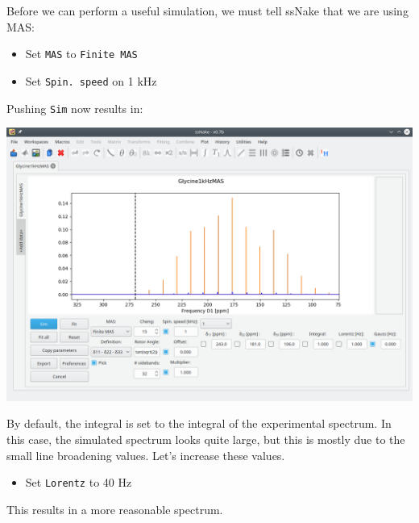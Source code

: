 \documentclass[11pt,a4paper]{article}
\begin{document}
Before we can perform a useful simulation, we must tell ssNake that we are using MAS:
\begin{itemize}
  \item Set \texttt{MAS} to \texttt{Finite MAS}
  \item Set \texttt{Spin.\ speed} on 1 kHz
\end{itemize}
Pushing \texttt{Sim} now results in:
\begin{center}
\includegraphics[width=0.8\linewidth]{Figs/Fig8.png}
\end{center}
By default, the integral is set to the integral of the experimental spectrum.
In this case, the simulated spectrum looks quite large, but this is mostly due to the small line broadening values.
Let's increase these values.
\begin{itemize}
  \item Set \texttt{Lorentz} to 40 Hz
\end{itemize}
This results in a more reasonable spectrum.
\end{document}
